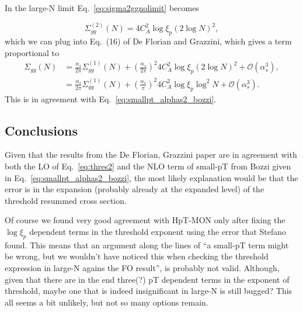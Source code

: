 \documentclass[10pt]{report}
\begin{document}
In the large-N limit Eq.~\eqref{eq:sigma2ggnolimit} becomes 

\begin{equation}
\Sigma^{(2)}_{gg}(N) = 4 C_A^2 \log \xi_p \left( 2 \log N\right)^2,
\label{eq:sigma2largeN}
\end{equation}
which we can plug into Eq.~(16) of De Florian and Grazzini, which gives a term proportional to
\begin{align}
\Sigma_{gg}(N) &= \frac{\alpha_s}{2\pi} \Sigma^{(1)}_{gg}(N) + \left( \frac{\alpha_s}{2\pi} \right)^2 4 C_A^2 \log \xi_p \left( 2 \log N\right)^2+ \mathcal{O}(\alpha_s^3), \\
&= \frac{\alpha_s}{2\pi} \Sigma^{(1)}_{gg}(N) + \left( \frac{\alpha_s}{\pi} \right)^2 4 C_A^2 \log \xi_p \log^2 N + \mathcal{O}(\alpha_s^3).
\end{align}
This is in agreement with Eq.~\eqref{eq:smallpt_alphas2_bozzi}. 



\subsection{Conclusions}
Given that the results from the De Florian, Grazzini paper are in agreement with both the LO of Eq.~\eqref{eq:thres2} and the NLO term of small-pT from Bozzi given in Eq.~\eqref{eq:smallpt_alphas2_bozzi}, the most likely explanation would be that the error is in the expansion (probably already at the expanded level) of the threshold resummed cross section.

Of course we found very good agreement with HpT-MON only after fixing the $\log \xi_p$ dependent terms in the threshold exponent using the error that Stefano found. This means that an argument along the lines of ``a small-pT term might be wrong, but we wouldn't have noticed this when checking the threshold expression in large-N agains the FO result'', is probably not valid. Although, given that there are in the end three(?) pT dependent terms in the exponent of threshold, maybe one that is indeed insignificant in large-N is still bugged? This all seems a bit unlikely, but not so many options remain. 
\end{document}
